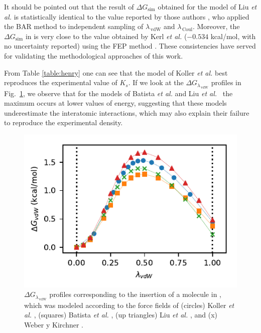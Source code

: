 \documentclass[3p,twocolumn]{elsarticle}
\begin{document}
It should be pointed out that the result of $\Delta G_{\text{sim}}$ obtained for the model of Liu \textit{et al.} \cite{Liu_2014} is statistically identical to the value reported by those authors \cite{Liu_2014_1}, who applied the BAR method \cite{Bennett_1976} to independent sampling of $\lambda_{\,\text{vdW}}$ and $\lambda_{\, \text{Coul}}$.
Moreover, the $\Delta G_{\text{sim}}$ in \ce{[emim][NTf_2]} is very close to the value obtained by Kerl \textit{et al.} \cite{Kerl__2017} ($-0.534$ kcal/mol, with no uncertainty reported) using the FEP method \cite{Zwanzig_1954}.
These consistencies have served for validating the methodological approaches of this work.

From Table \ref{table:henry} one can see that the model of Koller \textit{et al.} \cite{Koller_2012} best reproduces the experimental value of $K_s$.
If we look at the $\Delta G_{\lambda_{\,\text{vdW}}}$ profiles in Fig.~\ref{fig:deltag}, we observe that for the models of Batista \textit{et al.} \cite{Batista_2015} and Liu \textit{et al.}~\cite{Liu_2014} the maximum occurs at lower values of energy, suggesting that these models underestimate the interatomic interactions, which may also explain their failure to reproduce the experimental density.

\begin{figure}[ht]
\includegraphics[width=\linewidth]{free_energy_paper}
\caption{$\Delta G_{\lambda_{\,\text{vdW}}}$ profiles corresponding to the insertion of a  molecule in \ce{[emim][B(CN)_4]}, which was modeled according to the force fields of (circles) Koller \textit{et al.} \cite{Koller_2012}, (squares) Batista \textit{et al.} \cite{Batista_2015}, (up triangles) Liu \textit{et al.} \cite{Liu_2014}, and (x) Weber y Kirchner \cite{Weber_2016}.}
\label{fig:deltag}
\end{figure}
\end{document}

